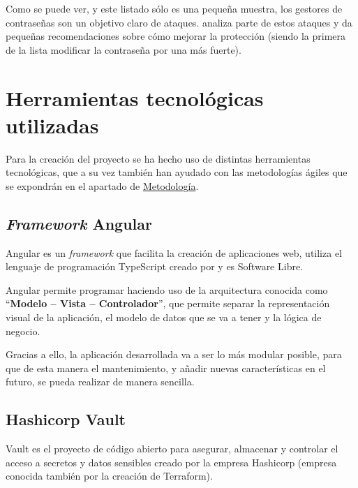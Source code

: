 \documentclass{\ClassPath/viu-tfm-template}
\begin{document}
Como se puede ver, y este listado sólo es una pequeña muestra, los gestores de contraseñas son un objetivo claro de ataques.  \textcite{hacked3} analiza parte de estos ataques y da pequeñas recomendaciones sobre cómo mejorar la protección (siendo la primera de la lista modificar la contraseña por una más fuerte).


\section{Herramientas tecnológicas utilizadas}

Para la creación del proyecto se ha hecho uso de distintas herramientas tecnológicas, que a su vez también han ayudado con las metodologías ágiles que se expondrán en el apartado de \hyperlink{metodologia}{Metodología}.


\subsection{\textit{Framework} Angular}

Angular es un \textit{framework} que facilita la creación de aplicaciones web, utiliza el lenguaje de programación TypeScript creado por \textcite{typescript} y es Software Libre.

Angular permite programar haciendo uso de la arquitectura conocida como “\textbf{Modelo – Vista – Controlador}”, que  permite separar la representación visual de la aplicación, el modelo de datos que se va a tener y la lógica de negocio.

Gracias a ello, la aplicación desarrollada va a ser lo más modular posible, para que de esta manera el mantenimiento, y añadir nuevas características en el futuro, se pueda realizar de manera sencilla.


\subsection{Hashicorp Vault}

Vault es el proyecto de código abierto para asegurar, almacenar y controlar el acceso a secretos y datos sensibles creado por la empresa Hashicorp (empresa conocida también por la creación de Terraform).
\end{document}
